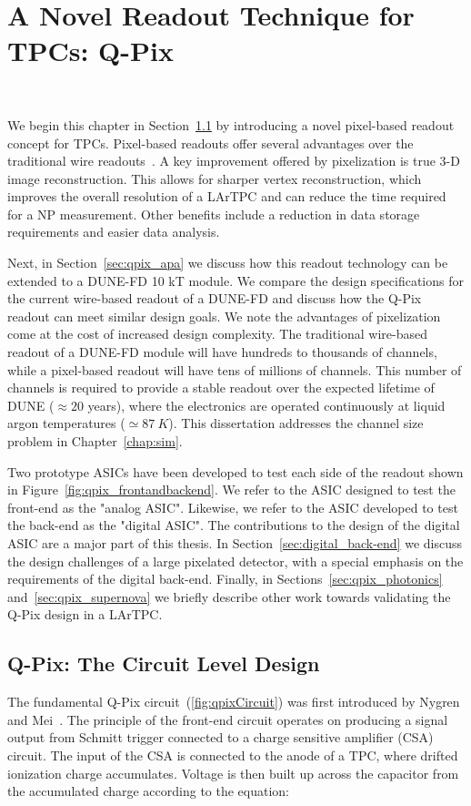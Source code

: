 \chapter{A Novel Readout Technique for TPCs: Q-Pix}~\label{chap:qpix}

We begin this chapter in Section~\ref{sec:qpix_circuit} by introducing a novel pixel-based readout concept for TPCs.
Pixel-based readouts offer several advantages over the traditional wire readouts~\citep{lartpc_recon_problems_joshi_2015}.
A key improvement offered by pixelization is true 3-D image reconstruction.
This allows for sharper vertex reconstruction, which improves the overall resolution of a LArTPC and can reduce the time required for a NP measurement.
Other benefits include a reduction in data storage requirements and easier data analysis.

Next, in Section~\ref{sec:qpix_apa} we discuss how this readout technology can be extended to a DUNE-FD 10 kT module.
We compare the design specifications for the current wire-based readout of a DUNE-FD and discuss how the Q-Pix readout can meet similar design goals.
We note the advantages of pixelization come at the cost of increased design complexity.
The traditional wire-based readout of a DUNE-FD module will have hundreds to thousands of channels, while a pixel-based readout will have tens of millions of channels.
This number of channels is required to provide a stable readout over the expected lifetime of DUNE ($\approx 20$ years), where the electronics are operated continuously at liquid argon temperatures ($\simeq 87~\unit{K}$).
This dissertation addresses the channel size problem in Chapter~\ref{chap:sim}.

Two prototype ASICs have been developed to test each side of the readout shown in Figure~\ref{fig:qpix_frontandbackend}.
We refer to the ASIC designed to test the front-end as the "analog ASIC".
Likewise, we refer to the ASIC developed to test the back-end as the "digital ASIC".
The contributions to the design of the digital ASIC are a major part of this thesis.
In Section~\ref{sec:digital_back-end} we discuss the design challenges of a large pixelated detector, with a special emphasis on the requirements of the digital back-end.
Finally, in Sections~\ref{sec:qpix_photonics} and~\ref{sec:qpix_supernova} we briefly describe other work towards validating the Q-Pix design in a LArTPC.

\section{Q-Pix: The Circuit Level Design}
\label{sec:qpix_circuit}
The fundamental Q-Pix circuit~(\ref{fig:qpixCircuit}) was first introduced by Nygren and Mei~\citep{qpix:nygren:mei}.
The principle of the front-end circuit operates on producing a signal output from Schmitt trigger connected to a charge sensitive amplifier (CSA) circuit.
The input of the CSA is connected to the anode of a TPC, where drifted ionization charge accumulates.
Voltage is then built up across the capacitor from the accumulated charge according to the equation:

